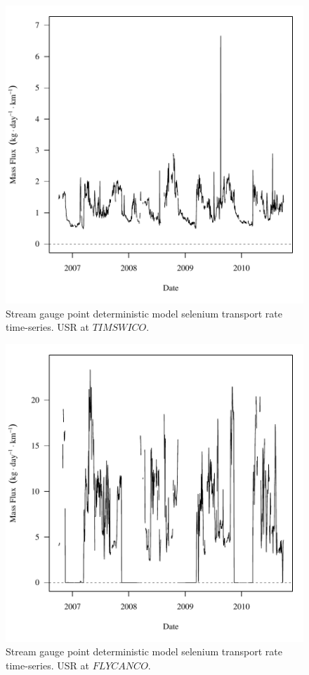 \begin{figure}[htbp]
	\begin{center}
	\includegraphics[width=6in]{"Figures/Results_DUSR/f TIM"}
	\caption{Stream gauge point deterministic model selenium transport rate time-series.  USR at $TIMSWICO$.}
	\end{center}
\end{figure}
\newpage

\begin{figure}[htbp]
	\begin{center}
	\includegraphics[width=6in]{"Figures/Results_DUSR/f FLY"}
	\caption{Stream gauge point deterministic model selenium transport rate time-series.  USR at $FLYCANCO$.}
	\end{center}
\end{figure}
\newpage

